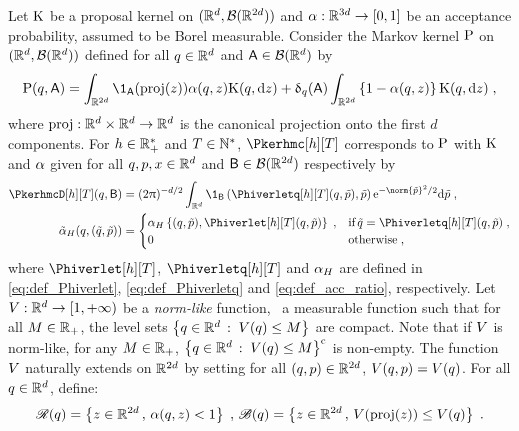 Let $\mathrm{K}$ be a proposal kernel on $(\mathbb{R}^d, \mathcal{B}(\mathbb{R}^{2d}))$ and $\alpha : \mathbb{R}^{3 d } \to
\left[0,1\right]$ be an acceptance probability, assumed to be Borel measurable. Consider the Markov kernel $\mathrm{P}$ on $(\mathbb{R}^d,\mathcal{B}(\mathbb{R}^d))$ defined for all $q \in \mathbb{R}^d$ and
$\mathsf{A} \in \mathcal{B}(\mathbb{R}^d)$ by
\begin{equation}
\label{eq:def_kenel_MH}
  \Pker(\q,\eventA) = \int_{\rset^{2d}} \1_{\eventA}(\projq(z)) \alphagen(\q,z) \Kker(\q, \rmd z )
+ \updelta_{\q}(\eventA) \int_{\rset^{2d}} \defEns{1- \alphagen(\q,z) }\Kker(\q, \rmd z)  \eqsp,
\end{equation}
where $\mathrm{proj} : \mathbb{R}^{d} \times \mathbb{R}^d \to \mathbb{R}^d$ is the canonical projection onto the first
$d$ components.
For $h \in \mathbb{R}^*_+$ and $T \in \mathbb{N}^*$, $\Pkerhmc[h][T]$ corresponds to $\mathrm{P}$ with
$\mathrm{K}$ and $\alpha$  given for all $q,p,x \in \mathbb{R}^d$ and $\mathsf{B} \in
\mathcal{B}(\mathbb{R}^{2d})$ respectively by
\begin{align}
\label{eq:def_Pker_proposition_double}
  \PkerhmcD[h][T](\q,\Bsf) &= (2\uppi)^{-d/2}\int_{\rset^{d}} \1_{\Bsf}\parenthese{\Phiverletq[h][T](\q,\tilde{\p}),\tilde{\p}} \rme^{-\norm{\tilde{\p}}^2/2} \rmd \tilde{\p} \eqsp, \\
\label{eq:def_alpha_acc_tilde_hmc}
\tildeAlphaacc(\q,(\tilde{\q},\tilde{\p})) & =
\begin{cases}
\alphaacc\defEns{(\q,\tilde{p}),\Phiverlet[h][T](\q,\tilde{p})} \eqsp, & \text{if}\, \tilde{q}= \Phiverletq[h][T](\q,\tilde{\p}) \eqsp, \\
0 & \text{otherwise} \eqsp,
\end{cases}
\end{align}
where  $\Phiverlet[h][T]$, $\Phiverletq[h][T]$ and $\alpha_{H}$  are  defined in   \eqref{eq:def_Phiverlet}, \eqref{eq:def_Phiverletq} and \eqref{eq:def_acc_ratio}, respectively. Let $V : \mathbb{R}^d \to \left[1,+\infty\right)$ be a
\emph{norm-like}  function,  \ie\ a measurable function such that for all $M \in \mathbb{R}_+$, the level sets $\left\{q \in \mathbb{R}^d\,:\; V(q) \leq M\right\}$ are compact. Note that if $V$ is norm-like, for any $M \in \mathbb{R}_+$, $\left\{q \in \mathbb{R}^d\,:\; V(q) \leq M\right\}^{\operatorname{c}}$ is non-empty.   The function $V$ naturally extends on $\mathbb{R}^{2d}$ by
setting for all $(q,p) \in \mathbb{R}^{2d}$, $V(q,p) = V(q)$.
For all $q \in \mathbb{R}^d$, define:
\begin{equation}
\label{eq:def_rej_ballV}
  \mathscr{R}(q) = \left\lbrace z \in \mathbb{R}^{2d} \, , \, \alpha(q,z) < 1   \right\rbrace \;, \,
    \mathscr{B}(q) = \left\lbrace z \in \mathbb{R}^{2d} \, , \, V(\mathrm{proj}(z)) \leq V(q)  \right\rbrace \;.
\end{equation}

